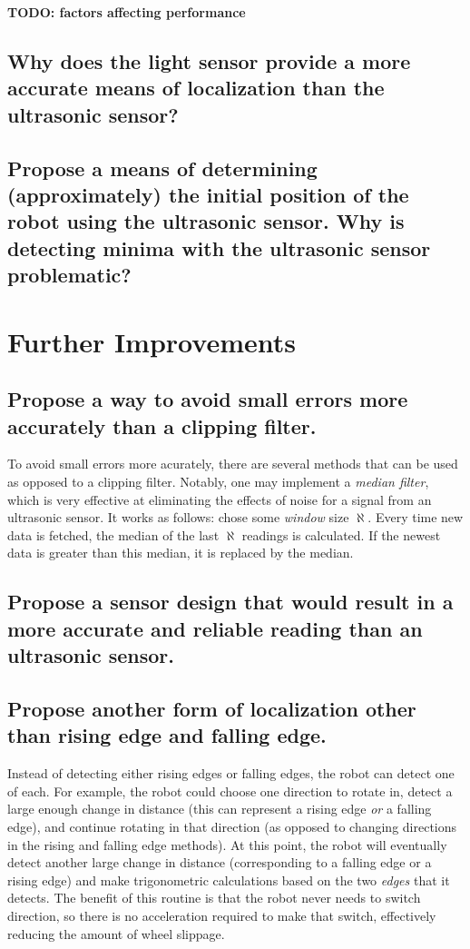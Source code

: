\documentclass[11pt]{article}
\begin{document}
\textbf{TODO: factors affecting performance}

\subsection{Why does the light sensor provide a more accurate means of localization than the
ultrasonic sensor?}

\subsection{Propose a means of determining (approximately) the initial position of the robot using
the ultrasonic sensor. Why is detecting minima with the ultrasonic sensor problematic?}

\section{Further Improvements}
\subsection{Propose a way to avoid small errors more accurately than a clipping filter.}
To avoid small errors more acurately, there are several methods that can be used as opposed to a
clipping filter. Notably, one may implement a \textit{median filter}, which is very effective at
eliminating the effects of noise for a signal from an ultrasonic sensor. It works as follows: chose
some \textit{window} size $\aleph$. Every time new data is fetched, the median of the last $\aleph$
readings is calculated. If the newest data is greater than this median, it is replaced by the
median.

\subsection{Propose a sensor design that would result in a more accurate and reliable reading than
an ultrasonic sensor.}

\subsection{Propose another form of localization other than rising edge and falling edge.}
\par Instead of detecting either rising edges or falling edges, the robot can detect one of each. For
example, the robot could choose one direction to rotate in, detect a large enough change in distance
(this can represent a rising edge \textit{or} a falling edge), and continue rotating in that
direction (as opposed to changing directions in the rising and falling edge methods). At this point,
the robot will eventually detect another large change in distance (corresponding to a falling edge
or a rising edge) and make trigonometric calculations based on the two \textit{edges} that it
detects. The benefit of this routine is that the robot never needs to switch direction, so there is
no acceleration required to make that switch, effectively reducing the amount of wheel slippage.
\end{document}
